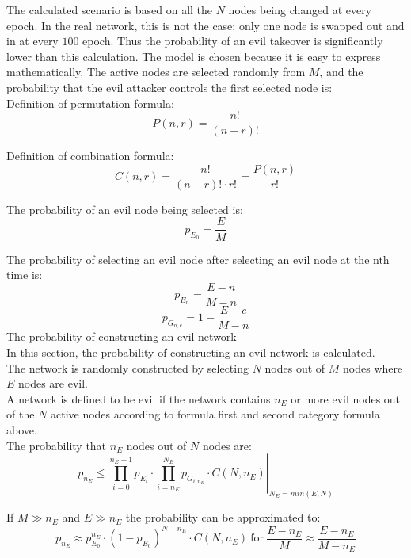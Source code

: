 The calculated scenario is based on all the $N$ nodes being changed at every epoch. In the real network, this is not the case; only one node is swapped out and in at every $100$ epoch. Thus the probability of an evil takeover is significantly lower than this calculation. The model is chosen because it is easy to express mathematically. 
The active nodes are selected randomly from $M$, and the probability that the evil attacker controls the first selected node is:\\

Definition of permutation formula:
\begin{equation}
 P(n,r) = \frac{n!}{(n-r)!}
\end{equation}

Definition of combination formula:
\begin{equation}
 C(n,r) = \frac{n!}{(n-r)! \cdot r!} = \frac{P(n,r)}{r!}
\end{equation}


The probability of an evil node being selected is:
\begin{equation}
 p_{E_0} = \frac{E}{M}
\end{equation}

The probability of selecting an evil node after selecting an evil node at the nth time is:
\begin{equation}
 p_{E_n} = \frac{E-n}{M-n}
\end{equation}
\begin{equation}
p_{G_{n,e}} = 1-\frac{E-e}{M-n}
\end{equation}
The probability of constructing an evil network\\
In this section, the probability of constructing an evil network is calculated.\\
The network is randomly constructed by selecting $N$ nodes out of $M$ nodes where $E$ nodes are evil.\\
A network is defined to be evil if the network contains $n_E$ or more evil nodes out of the $N$ active nodes according to formula first and second category formula above.\\

The probability that $n_E$ nodes out of $N$ nodes are:
\begin{equation}
 p_{n_E} \leq \left. \prod_{i=0}^{n_E-1}{p_{E_i}} \cdot 
 \prod_{i=n_E}^{N_E}
 {p_{G_{i,n_E}} \cdot C(N,n_E)} \right| _{N_E = min(E,N)}
\end{equation}


If $M \gg n_E$  and $E \gg n_E$  the probability can be approximated to:
\begin{equation}
 p_{n_E} \approx p_{E_0}^{n_E} \cdot (1-p_{E_0})^{N-n_E} \cdot C(N,n_E) ~ \text{for} ~ \frac{E-n_E}{M} \approx \frac{E-n_E}{M-n_E}
\end{equation}

